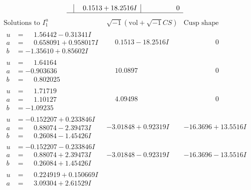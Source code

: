 \documentclass[1p]{elsarticle_modified}
\theoremstyle{definition}
\newcommand{\I}{\sqrt{-1}}
\begin{document}
$$\begin{array}{c|c|c}
 & \phantom{-}0.1513 + 18.2516 I & \phantom{-0.000000 } 0\\
 \hline 
 \end{array}$$\newpage$$\begin{array}{c|c|c}  
\text{Solutions to }I^u_{1}& \I (\text{vol} + \sqrt{-1}CS) & \text{Cusp shape}\\
 \hline 
\begin{aligned}
u &= \phantom{-}1.56442 - 0.31341 I \\
a &= \phantom{-}0.658091 + 0.958017 I \\
b &= -1.35610 + 0.85602 I\end{aligned}
 & \phantom{-}0.1513 - 18.2516 I & \phantom{-0.000000 } 0 \\ \hline\begin{aligned}
u &= \phantom{-}1.64164\phantom{ +0.000000I} \\
a &= -0.903636\phantom{ +0.000000I} \\
b &= \phantom{-}0.802025\phantom{ +0.000000I}\end{aligned}
 & \phantom{-}10.0897\phantom{ +0.000000I} & \phantom{-0.000000 } 0 \\ \hline\begin{aligned}
u &= \phantom{-}1.71719\phantom{ +0.000000I} \\
a &= \phantom{-}1.10127\phantom{ +0.000000I} \\
b &= -1.09235\phantom{ +0.000000I}\end{aligned}
 & \phantom{-}4.09498\phantom{ +0.000000I} & \phantom{-0.000000 } 0 \\ \hline\begin{aligned}
u &= -0.152207 + 0.233846 I \\
a &= \phantom{-}0.88074 - 2.39473 I \\
b &= \phantom{-}0.26084 - 1.45426 I\end{aligned}
 & -3.01848 + 0.92319 I & -16.3696 + 13.5516 I \\ \hline\begin{aligned}
u &= -0.152207 - 0.233846 I \\
a &= \phantom{-}0.88074 + 2.39473 I \\
b &= \phantom{-}0.26084 + 1.45426 I\end{aligned}
 & -3.01848 - 0.92319 I & -16.3696 - 13.5516 I \\ \hline\begin{aligned}
u &= \phantom{-}0.224919 + 0.150669 I \\
a &= \phantom{-}3.09304 + 2.61529 I \\

\end{aligned}
\end{array}$$
\end{document}
